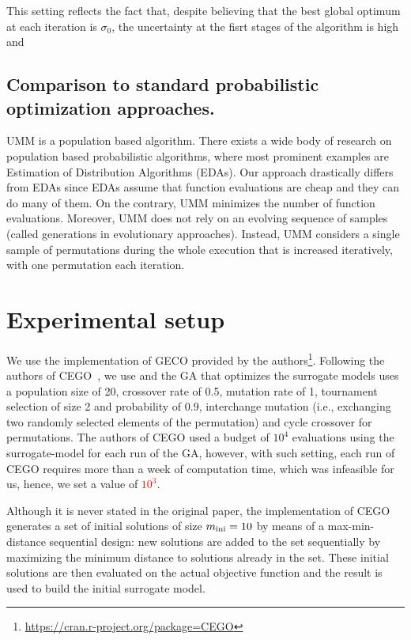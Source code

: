 \documentclass[runningheads]{llncs}
\begin{document}
This setting reflects the fact that, despite believing that the best global optimum at each iteration is $\sigma_0$, the uncertainty at the fisrt stages of the algorithm is high and



\subsection{Comparison to standard probabilistic optimization approaches.}
UMM is a population based algorithm. There exists a wide body of research on population based probabilistic algorithms, where most prominent examples are Estimation of Distribution Algorithms (EDAs). Our approach drastically differs from EDAs since EDAs assume that function evaluations are cheap and they can do many of them. On the contrary, UMM minimizes the number of function evaluations. Moreover, UMM does not rely on an evolving sequence of samples (called generations in evolutionary approaches). Instead, UMM considers a single sample of permutations during the whole execution that is increased iteratively, with one permutation each iteration. 








\section{Experimental setup}

We use the implementation of GECO provided by the
authors\footnote{\url{https://cran.r-project.org/package=CEGO}}. Following the
authors of CEGO~\citep{ZaeStoFriFisNauBar2014,ZaeStoBar2014:ppsn}, we use and
the GA that optimizes the surrogate models uses a population size of 20,
crossover rate of 0.5, mutation rate of 1, tournament selection of size 2 and
probability of 0.9, interchange mutation (i.e., exchanging two randomly
selected elements of the permutation) and cycle crossover for permutations. The
authors of CEGO used a budget of $10^4$ evaluations using the surrogate-model
for each run of the GA, however, with such setting, each run of CEGO requires
more than a week of computation time, which was infeasible for us, hence, we
set a value of \textcolor{red}{$10^3$}.

Although it is never stated in the original paper, the implementation of CEGO
generates a set of initial solutions of size $m_\text{ini}=10$ by means of a
max-min-distance sequential design: new solutions are added to the set
sequentially by maximizing the minimum distance to solutions already in the
set. These initial solutions are then evaluated on the actual objective
function and the result is used to build the initial surrogate
model.%
\end{document}
